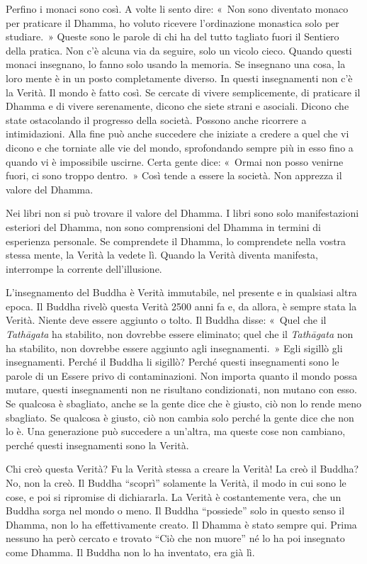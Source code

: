 Perfino i monaci sono così. A volte li sento dire: «~Non sono diventato
monaco per praticare il Dhamma, ho voluto ricevere l'ordinazione
monastica solo per studiare.~» Queste sono le parole di chi ha del tutto
tagliato fuori il Sentiero della pratica. Non c'è alcuna via da seguire,
solo un vicolo cieco. Quando questi monaci insegnano, lo fanno solo
usando la memoria. Se insegnano una cosa, la loro mente è in un posto
completamente diverso. In questi insegnamenti non c'è la Verità. Il
mondo è fatto così. Se cercate di vivere semplicemente, di praticare il
Dhamma e di vivere serenamente, dicono che siete strani e asociali.
Dicono che state ostacolando il progresso della società. Possono anche
ricorrere a intimidazioni. Alla fine può anche succedere che iniziate a
credere a quel che vi dicono e che torniate alle vie del mondo,
sprofondando sempre più in esso fino a quando vi è impossibile uscirne.
Certa gente dice: «~Ormai non posso venirne fuori, ci sono troppo
dentro.~» Così tende a essere la società. Non apprezza il valore del
Dhamma.

Nei libri non si può trovare il valore del Dhamma. I libri sono solo
manifestazioni esteriori del Dhamma, non sono comprensioni del Dhamma in
termini di esperienza personale. Se comprendete il Dhamma, lo
comprendete nella vostra stessa mente, la Verità la vedete lì. Quando la
Verità diventa manifesta, interrompe la corrente dell'illusione.

L'insegnamento del Buddha è Verità immutabile, nel presente e in
qualsiasi altra epoca. Il Buddha rivelò questa Verità 2500 anni fa e, da
allora, è sempre stata la Verità. Niente deve essere aggiunto o tolto.
Il Buddha disse: «~Quel che il \emph{Tathāgata} ha stabilito, non
dovrebbe essere eliminato; quel che il \emph{Tathāgata} non ha
stabilito, non dovrebbe essere aggiunto agli insegnamenti.~» Egli
sigillò gli insegnamenti. Perché il Buddha li sigillò? Perché questi
insegnamenti sono le parole di un Essere privo di contaminazioni. Non
importa quanto il mondo possa mutare, questi insegnamenti non ne
risultano condizionati, non mutano con esso. Se qualcosa è sbagliato,
anche se la gente dice che è giusto, ciò non lo rende meno sbagliato. Se
qualcosa è giusto, ciò non cambia solo perché la gente dice che non lo
è. Una generazione può succedere a un'altra, ma queste cose non
cambiano, perché questi insegnamenti sono la Verità.

Chi creò questa Verità? Fu la Verità stessa a creare la Verità! La creò
il Buddha? No, non la creò. Il Buddha ``scoprì'' solamente la Verità, il
modo in cui sono le cose, e poi si ripromise di dichiararla. La Verità è
costantemente vera, che un Buddha sorga nel mondo o meno. Il Buddha
``possiede'' solo in questo senso il Dhamma, non lo ha effettivamente
creato. Il Dhamma è stato sempre qui. Prima nessuno ha però cercato e
trovato ``Ciò che non muore'' né lo ha poi insegnato come Dhamma. Il
Buddha non lo ha inventato, era già lì.


